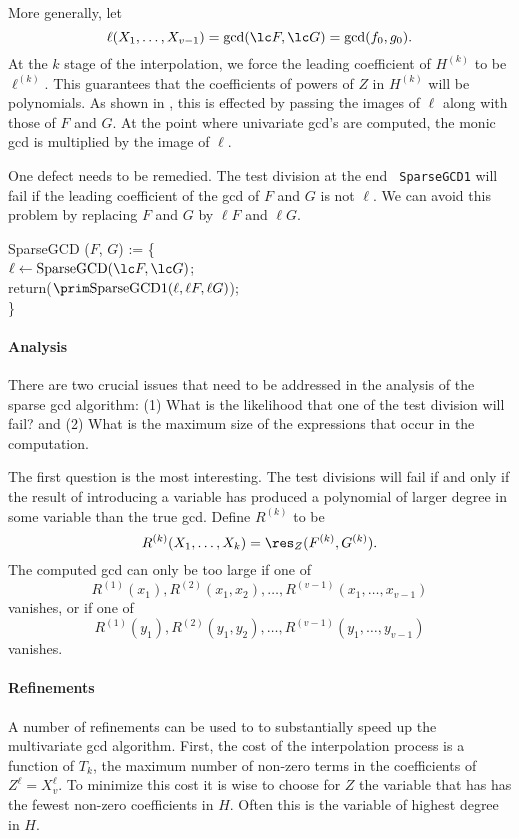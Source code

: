 More generally, let
\[
\ell(X_1, \ldots, X_{v-1}) = \gcd(\lc F, \lc G) = \gcd (f_0, g_0).
\]
At the $k${\th} stage of the interpolation, we force the leading
coefficient of $H^{(k)}$ to be $\ell^{(k)}$.  This guarantees that the
coefficients of powers of $Z$ in $H^{(k)}$ will be polynomials.  As
shown in , this is effected by passing the
images of $\ell$ along with those of $F$ and $G$.  At the point where
univariate {\sc gcd}'s are computed, the monic {\sc gcd} is multiplied
by the image of $\ell$.

One defect needs to be remedied.  The test division at the end {\tt
SparseGCD1} will fail if the leading coefficient of the {\sc gcd} of
$F$ and $G$ is not $\ell$.  We can avoid this problem by replacing $F$
and $G$ by $\ell F$ and $\ell G$. 

\begindsacode
SparseGCD ($F$, $G$) := \{ \\
\> $\ell \leftarrow \mbox{SparseGCD}(\lc F, \lc G)$; \\
\> return($\prim \mbox{SparseGCD1}(\ell, \ell F, \ell G)$); \\
\> \}
\enddsacode

\paragraph{Analysis}

There are two crucial issues that need to be addressed in the analysis of
the sparse {\sc gcd} algorithm: (1) What is the likelihood that one of
the test division will fail? and (2) What is the maximum size of the
expressions that occur in the computation.  

The first question is the most interesting.  The test divisions will
fail if and only if the result of introducing a variable has produced
a polynomial of larger degree in some variable than the true {\sc
gcd}.  Define $R^{(k)}$ to be
\[
R^{(k)}(X_1, \ldots, X_k) = \res_Z (F^{(k)}, G^{(k)}).
\]
The computed {\sc gcd} can only be too large if one of 
\[
R^{(1)}(x_1), R^{(2)}(x_1, x_2), \ldots, R^{(v-1)}(x_1, \ldots, x_{v-1})
\]
vanishes, or if one of
\[
R^{(1)}(y_1), R^{(2)}(y_1, y_2), \ldots, R^{(v-1)}(y_1, \ldots, y_{v-1})
\]
vanishes.

\paragraph{Refinements}

A number of refinements can be used to to substantially speed up the
multivariate {\sc gcd} algorithm.  First, the cost of the
interpolation process is a function of $T_k$, the maximum number of
non-zero terms in the coefficients of $Z^{\ell} = X_v^{\ell}$.  To
minimize this cost it is wise to choose for $Z$ the variable that has
has the fewest non-zero coefficients in $H$.  Often this is the
variable of highest degree in $H$.

